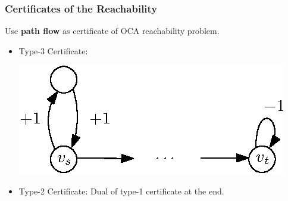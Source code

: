 \documentclass[11pt]{beamer}
\begin{document}
\begin{frame}\frametitle{Certificates of the Reachability}

Use \textbf{path flow} as certificate of OCA reachability problem.
\pause
\begin{itemize}

\pause


\item Type-3 Certificate:
\begin{center}
\includegraphics[scale=1]{type2.eps}
\end{center}
\pause
\item Type-2 Certificate: Dual of type-1 certificate at the end.

\end{itemize}


\end{frame}
\end{document}
